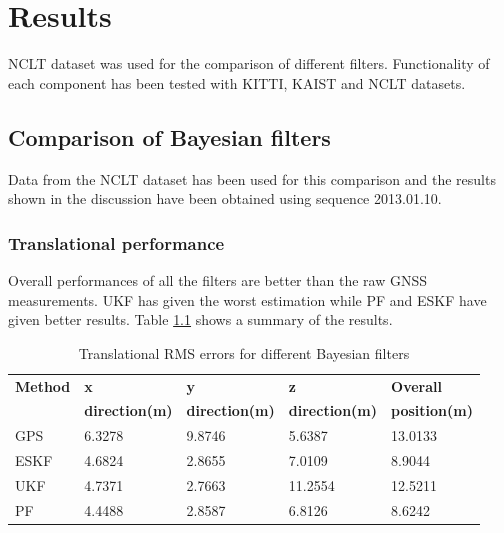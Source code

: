\chapter{Results}
\label{chapter:results}
\gls{NCLT} dataset was used for the comparison of different filters. Functionality of each component has been tested with \gls{KITTI}, \gls{KAIST} and \gls{NCLT} datasets.




\section{Comparison of Bayesian filters}
\label{sec:BayesianFilterComparison}
Data from the \gls{NCLT} dataset has been used for this comparison and the results shown in the discussion have been obtained using sequence 2013.01.10.
\subsection{Translational performance}
Overall performances of all the filters are better than the raw \gls{GNSS} measurements. \gls{UKF} has given the worst estimation while \gls{PF} and \gls{ESKF} have given better results. Table \ref{table:ch:RMSErrorPosition} shows a summary of the results.
\begin{table}[h]
    \centering
    \begin{tabular}{|p{2.5cm}|p{2.5cm}|p{2.5cm}|p{2.5cm}|p{2.5cm}|} 
        \hline
            
        \textbf{Method} & \textbf{x} & \textbf{y} & \textbf{z}& \textbf{Overall} \\
        \textbf{} & \textbf{direction(m)} & \textbf{direction(m)} & \textbf{direction(m)}& \textbf{position(m)} \\
        \hline
        GPS&6.3278 &9.8746 &5.6387& 13.0133\\
        \hline
        ESKF &4.6824& 2.8655 &7.0109 &8.9044\\
        \hline
        UKF &4.7371& 2.7663 &11.2554 &12.5211
        \\
        \hline
        PF& 4.4488& 2.8587& 6.8126& 8.6242
        \\
        \hline
    \end{tabular}
\caption{Translational \gls{RMS} errors for different Bayesian filters}
\label{table:ch:RMSErrorPosition}
\end{table}

